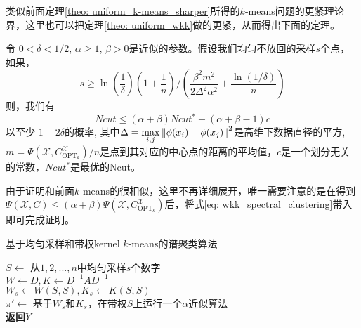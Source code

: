 类似前面定理\ref{theo: uniform_k-means_sharper}所得的$k$-means问题的更紧理论界，这里也可以把定理\ref{theo: uniform_wkk}做的更紧，从而得出下面的定理。
\begin{theorem}[均匀不放回采样的谱聚类解的质量2]
    \label{theo: uniform_wkk_sharper}
    令 $0 < \delta <1/2$, $\alpha \geq 1$, $\beta >0$是近似的参数。假设我们均匀不放回的采样$s$个点，如果，
    \begin{equation}
    s \geq \ln(\frac{1}{\delta})(1+\frac{1}{n})/(\frac{\beta^2 m^2}{2\Delta^2 \alpha^2}+\frac{\ln(1/\delta)}{n})
    \end{equation}
    则，我们有
    \begin{equation}
    Ncut \leq (\alpha + \beta) Ncut^* + (\alpha + \beta -1)c
    \end{equation}
    以至少 $1-2\delta$的概率, 其中$\Delta = \max\limits_{i,j}\left\lVert\phi(x_i) - \phi(x_j)\right\rVert^2$是高维下数据直径的平方, $m = \Psi(\mathcal{X},C_{\text{OPT}_k}^{\mathcal{X}})/n$是点到其对应的中心点的距离的平均值，$c$是一个划分无关的常数，$Ncut^*$是最优的Ncut。
\end{theorem}
由于证明和前面$k$-means的很相似，这里不再详细展开，唯一需要注意的是在得到$\Psi(\mathcal{X},C) \leq (\alpha+\beta) \Psi(\mathcal{X},C_{\text{OPT}_k}^{\mathcal{X}})$后，将式\ref{eq: wkk_spectral_clustering}带入即可完成证明。
\begin{algorithm}
	\SetNoFillComment
    \caption{基于均匀采样和带权kernel $k$-means的谱聚类算法}\label{alg: uniform_wkk}
    $S \gets$ 从$1,2,...,n$中均匀采样$s$个数字\\
    $W \gets D,K \gets D^{-1}AD^{-1}$\\
    $W_s \gets W(S,S), K_s \gets K(S,S)$\\
    $\pi' \gets$ 基于$W_s$和$K_s$，在带权$S$上运行一个$\alpha$近似算法\\
    \textbf{返回}$Y$
\end{algorithm}